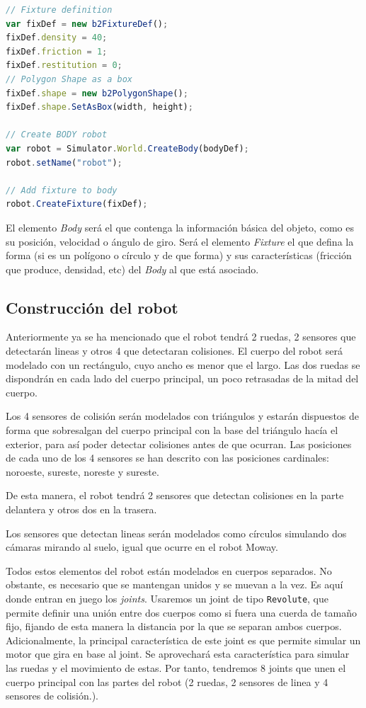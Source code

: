 {\begin{lstlisting}[language={Javascript},label={code:ejemplo-factoria}, caption={Creación del cuerpo principal del robot utilizando la librería Box2dweb.}]
// Fixture definition
var fixDef = new b2FixtureDef(); 
fixDef.density = 40;
fixDef.friction = 1;
fixDef.restitution = 0;
// Polygon Shape as a box
fixDef.shape = new b2PolygonShape(); 
fixDef.shape.SetAsBox(width, height);

// Create BODY robot
var robot = Simulator.World.CreateBody(bodyDef);
robot.setName("robot");

// Add fixture to body
robot.CreateFixture(fixDef);
\end{lstlisting}


El elemento \emph{Body} será el que contenga la información básica del objeto, como es su posición, velocidad o ángulo de giro. Será el elemento \emph{Fixture} el que defina la forma (si es un polígono o círculo y de que forma) y sus características (fricción que produce, densidad, etc) del \emph{Body} al que está asociado.


\subsection{Construcción del robot}
\label{sec:contruccion-robot}


Anteriormente ya se ha mencionado que el robot tendrá 2 ruedas, 2 sensores que detectarán lineas y otros 4 que detectaran colisiones. El cuerpo del robot será modelado con un rectángulo, cuyo ancho es menor que el largo. Las dos ruedas se dispondrán en cada lado del cuerpo principal, un poco retrasadas de la mitad del cuerpo.

Los 4 sensores de colisión serán modelados con triángulos y estarán dispuestos de forma que sobresalgan del cuerpo principal con la base del triángulo hacía el exterior, para así poder detectar colisiones antes de que ocurran. Las posiciones de cada uno de los 4 sensores se han descrito con las posiciones cardinales: noroeste, sureste, noreste y sureste. 

De esta manera, el robot tendrá 2 sensores que detectan colisiones en la parte delantera y otros dos en la trasera. 

Los sensores que detectan lineas serán modelados como círculos simulando dos cámaras mirando al suelo, igual que ocurre en el robot Moway. 

Todos estos elementos del robot están modelados en cuerpos separados. No obstante, es necesario que se mantengan unidos y se muevan a la vez. Es aquí donde entran en juego los \emph{joints}. Usaremos un joint de tipo \texttt{Revolute}, que permite definir una unión entre dos cuerpos como si fuera una cuerda de tamaño fijo, fijando de esta manera la distancia por la que se separan ambos cuerpos. Adicionalmente, la principal característica de este joint es que permite simular un motor que gira en base al joint. Se aprovechará esta característica para simular las ruedas y el movimiento de estas. Por tanto, tendremos 8 joints que unen el cuerpo principal con las partes del robot (2 ruedas, 2 sensores de linea y 4 sensores de colisión.).
 
}
